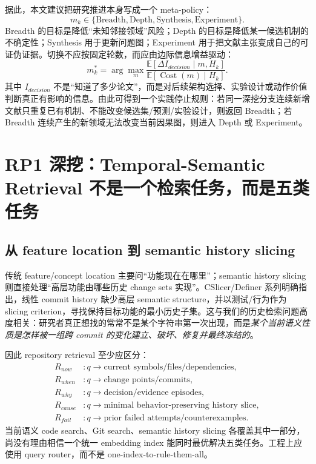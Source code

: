 \documentclass[11pt,a4paper]{ctexart}
\newcommand{\E}{\mathbb{E}}
\newcommand{\Cost}{\operatorname{Cost}}
\begin{document}
据此，本文建议把研究推进本身写成一个 meta-policy：
\begin{equation}
 m_k\in\{\text{Breadth},\text{Depth},\text{Synthesis},\text{Experiment}\}.
\end{equation}
Breadth 的目标是降低“未知邻接领域”风险；Depth 的目标是降低某一候选机制的不确定性；Synthesis 用于更新问题图；Experiment 用于把文献主张变成自己的可证伪证据。切换不应按固定轮数，而应由边际信息增益驱动：
\begin{equation}
 m_k^*=\arg\max_m\frac{\E[\Delta I_{decision}\mid m,H_k]}{\E[\Cost(m)\mid H_k]}.
\end{equation}
其中 $I_{decision}$ 不是“知道了多少论文”，而是对后续架构选择、实验设计或动作价值判断真正有影响的信息。由此可得到一个实践停止规则：若同一深挖分支连续新增文献只重复已有机制、不能改变候选集/预测/实验设计，则返回 Breadth；若 Breadth 连续产生的新领域无法改变当前因果图，则进入 Depth 或 Experiment。

\section{RP1 深挖：Temporal-Semantic Retrieval 不是一个检索任务，而是五类任务}

\subsection{从 feature location 到 semantic history slicing}

传统 feature/concept location 主要问“功能现在在哪里”；semantic history slicing 则直接处理“高层功能由哪些历史 change sets 实现”。CSlicer/Definer 系列明确指出，线性 commit history 缺少高层 semantic structure，并以测试/行为作为 slicing criterion，寻找保持目标功能的最小历史子集\parencite{li2018history,li2022semantic,zhu2020genslice}。这与我们的历史检索问题高度相关：研究者真正想找的常常不是某个字符串第一次出现，而是\emph{某个当前语义性质是怎样被一组跨 commit 的变化建立、破坏、修复并最终冻结的}。

因此 repository retrieval 至少应区分：
\begin{align}
R_{now}&: q\to \text{current symbols/files/dependencies},\\
R_{when}&: q\to \text{change points/commits},\\
R_{why}&: q\to \text{decision/evidence episodes},\\
R_{cause}&: q\to \text{minimal behavior-preserving history slice},\\
R_{fail}&: q\to \text{prior failed attempts/counterexamples}.
\end{align}
当前语义 code search、Git search、semantic history slicing 各覆盖其中一部分，尚没有理由相信一个统一 embedding index 能同时最优解决五类任务。工程上应使用 query router，而不是 one-index-to-rule-them-all。
\end{document}
